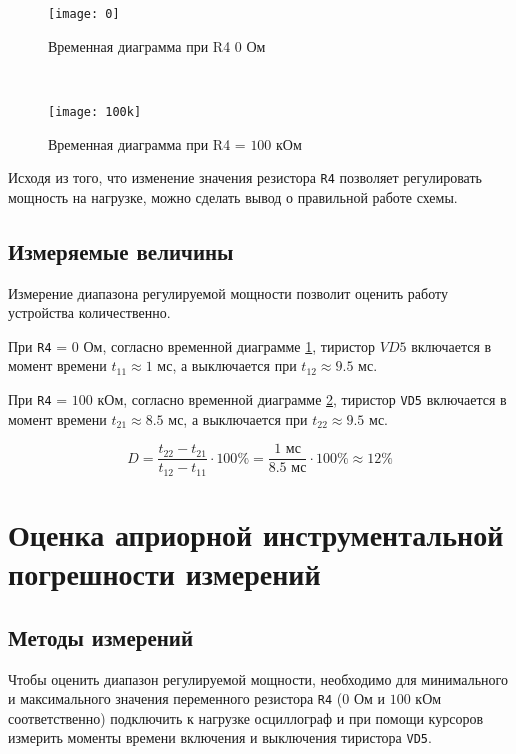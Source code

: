 \begin{figure}[H]
\begin{center}
	\texttt{[image: 0]}
	\caption{Временная диаграмма при R4 $0$ Ом}
	\label{pic:diag:0}
\end{center}
\end{figure}

~

\begin{figure}[H]
\begin{center}
	\texttt{[image: 100k]}
	\caption{Временная диаграмма при R4 = $100$ кОм}
	\label{pic:diag:100k}
\end{center}
\end{figure}

Исходя из того, что изменение значения резистора \verb+R4+ позволяет регулировать мощность на нагрузке, можно сделать вывод о правильной работе схемы.

\subsection{Измеряемые величины}

Измерение диапазона регулируемой мощности позволит оценить работу устройства количественно.

При \verb+R4+ = $0$ Ом, согласно временной диаграмме \ref{pic:diag:0}, тиристор $VD5$ включается в момент времени $t_{11} \approx 1$ мс, а выключается при $t_{12} \approx 9.5$ мс.

При \verb+R4+ = $100$ кОм, согласно временной диаграмме \ref{pic:diag:100k}, тиристор \verb+VD5+ включается в момент времени $t_{21} \approx 8.5$ мс, а выключается при $t_{22} \approx 9.5$ мс.

\begin{equation}
\label{eq:1:1}
	D = \frac{t_{22} - t_{21}}{t_{12} - t_{11}} \cdot 100\% = \frac{1 \text{ мс}}{8.5 \text{ мс}} \cdot 100\% \approx 12 \% 
\end{equation}

\section{Оценка априорной инструментальной погрешности измерений}

\subsection{Методы измерений}

Чтобы оценить диапазон регулируемой мощности, необходимо для минимального и максимального значения переменного резистора \verb+R4+ ($0$ Ом и $100$ кОм соответственно) подключить к нагрузке осциллограф и при помощи курсоров измерить моменты времени включения и выключения тиристора \verb+VD5+.

